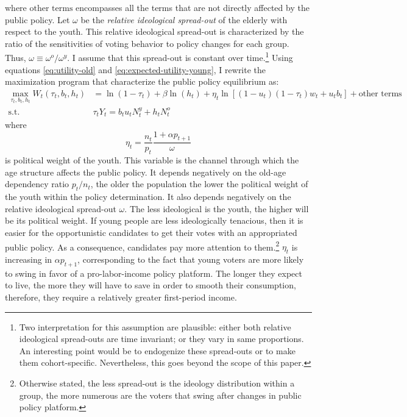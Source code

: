 \documentclass[
]{article}
\begin{document}
where \(\text{other terms}\) encompasses all the terms that are not directly affected by the public policy. Let \(\omega\) be the \emph{relative ideological spread-out} of the elderly with respect to the youth. This relative ideological spread-out is characterized by the ratio of the sensitivities of voting behavior to policy changes for each group. Thus, \(\omega \equiv \omega^o/\omega^y\). I assume that this spread-out is constant over time.\footnote{Two interpretation for this assumption are plausible: either both relative ideological spread-outs are time invariant; or they vary in same proportions. An interesting point would be to endogenize these spread-outs or to make them cohort-specific. Nevertheless, this goes beyond the scope of this paper.} Using equations \eqref{eq:utility-old} and \eqref{eq:expected-utility-young}, I rewrite the maximization program that characterize the public policy equilibrium as:
\begin{align*}
    \max_{\tau_t, b_t, h_t} W_t(\tau_t, b_t, h_t) &= \ln(1-\tau_t) +\beta \ln(h_t) + \eta_t \ln\left[(1-u_t)(1-\tau_t)w_t + u_t b_t\right] + \text{other terms} \\
    \text{s.t.} ~~ &\tau_t Y_t = b_t u_t N^y_t + h_t N^o_t
\end{align*}
where
\begin{equation}
    \eta_t = \frac{n_t}{p_t}\frac{1+\alpha p_{t+1}}{\omega} \label{eq:eta}
\end{equation}
is political weight of the youth. This variable is the channel through which the age structure affects the public policy. It depends negatively on the old-age dependency ratio \(p_t/n_t\), the older the population the lower the political weight of the youth within the policy determination. It also depends negatively on the relative ideological spread-out \(\omega\). The less ideological is the youth, the higher will be its political weight. If young people are less ideologically tenacious, then it is easier for the opportunistic candidates to get their votes with an appropriated public policy. As a consequence, candidates pay more attention to them.\footnote{Otherwise stated, the less spread-out is the ideology distribution within a group, the more numerous are the voters that swing after changes in public policy platform.} \(\eta_t\) is increasing in \(\alpha p_{t+1}\), corresponding to the fact that young voters are more likely to swing in favor of a pro-labor-income policy platform. The longer they expect to live, the more they will have to save in order to smooth their consumption, therefore, they require a relatively greater first-period income.
\end{document}
